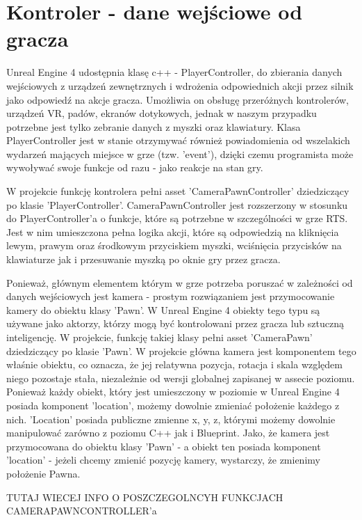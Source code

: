 \documentclass[12pt]{report}
\begin{document}
\section{Kontroler - dane wejściowe od gracza}
Unreal Engine 4 udostępnia klasę c++ - PlayerController, do zbierania danych wejściowych z urządzeń zewnętrznych i wdrożenia odpowiednich akcji przez silnik jako odpowiedź na akcje gracza. Umożliwia on obsługę przeróżnych kontrolerów, urządzeń VR, padów, ekranów dotykowych, jednak w naszym przypadku potrzebne jest tylko zebranie danych z myszki oraz klawiatury. Klasa PlayerController jest w stanie otrzymywać również powiadomienia od wszelakich wydarzeń mających miejsce w grze (tzw. 'event'), dzięki czemu programista może wywoływać swoje funkcje od razu - jako reakcje na stan gry.

W projekcie funkcję kontrolera pełni asset 'CameraPawnController' dziedziczący po klasie 'PlayerController'. CameraPawnController jest rozszerzony w stosunku do PlayerController'a o funkcje, które są potrzebne w szczególności w grze RTS. Jest w nim umieszczona pełna logika akcji, które są odpowiedzią na kliknięcia lewym, prawym oraz środkowym przyciskiem myszki, wciśnięcia przycisków na klawiaturze jak i przesuwanie myszką po oknie gry przez gracza.

Ponieważ, głównym elementem którym w grze potrzeba poruszać w zależności od danych wejściowych jest kamera - prostym rozwiązaniem jest przymocowanie kamery do obiektu klasy 'Pawn'. W Unreal Engine 4 obiekty tego typu są używane jako aktorzy, którzy mogą być kontrolowani przez gracza lub sztuczną inteligencję. W projekcie, funkcję takiej klasy pełni asset 'CameraPawn' dziedziczący po klasie 'Pawn'. W projekcie główna kamera jest komponentem tego właśnie obiektu, co oznacza, że jej relatywna pozycja, rotacja i skala względem niego pozostaje stała, niezależnie od wersji globalnej zapisanej w assecie poziomu. Ponieważ każdy obiekt, który jest umieszczony w poziomie w Unreal Engine 4 posiada komponent 'location', możemy dowolnie zmieniać położenie każdego z nich. 'Location' posiada publiczne zmienne x, y, z, którymi możemy dowolnie manipulować zarówno z poziomu C++ jak i Blueprint. Jako, że kamera jest przymocowana do obiektu klasy 'Pawn' - a obiekt ten posiada komponent 'location' - jeżeli chcemy zmienić pozycję kamery, wystarczy, że zmienimy położenie Pawna.

TUTAJ WIECEJ INFO O POSZCZEGOLNCYH FUNKCJACH CAMERAPAWNCONTROLLER'a
\end{document}

